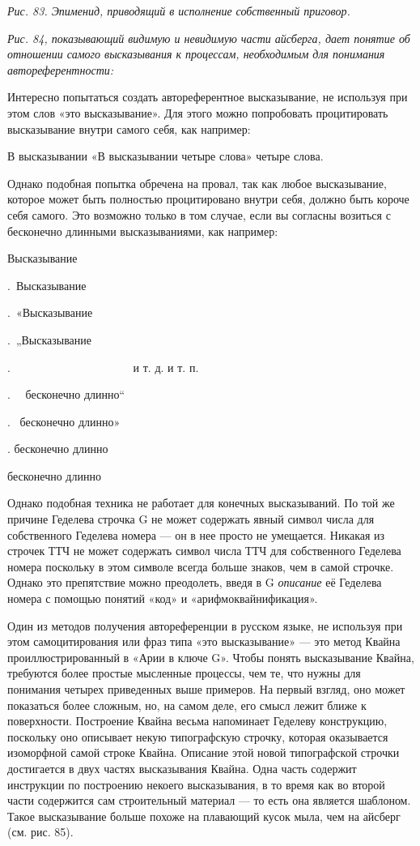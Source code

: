 \documentclass[../main.tex]{subfiles}
\begin{document}
\emph{Рис. 83. Эпименид, приводящий в исполнение собственный приговор.}

\emph{Рис. 84, показывающий видимую и невидимую части айсберга, дает понятие об отношении самого высказывания к процессам, необходимым для понимания автореферентности:}

Интересно попытаться создать автореферентное высказывание, не используя при этом слов «это высказывание». Для этого можно попробовать процитировать высказывание внутри самого себя, как например:

В высказывании «В высказывании четыре слова» четыре слова.

Однако подобная попытка обречена на провал, так как любое высказывание, которое может быть полностью процитировано внутри себя, должно быть короче себя самого. Это возможно только в том случае, если вы согласны возиться с бесконечно длинными высказываниями, как например:

Высказывание

.~Высказывание

.~«Высказывание

.~„Высказывание

.~~~~~~~~~~~~~~~~~~~~~ и т. д. и т. п.

.~~ бесконечно длинно``

.~ бесконечно длинно»

. бесконечно длинно

бесконечно длинно

Однако подобная техника не работает для конечных высказываний. По той же причине Геделева строчка G не может содержать явный символ числа для собственного Геделева номера --- он в нее просто не умещается. Никакая из строчек ТТЧ не может содержать символ числа ТТЧ для собственного Геделева номера поскольку в этом символе всегда больше знаков, чем в самой строчке. Однако это препятствие можно преодолеть, введя в G \emph{описание} её Геделева номера с помощью понятий «код» и «арифмоквайнификация».

Один из методов получения автореференции в русском языке, не используя при этом самоцитирования или фраз типа «это высказывание» --- это метод Квайна проиллюстрированный в «Арии в ключе G». Чтобы понять высказывание Квайна, требуются более простые мысленные процессы, чем те, что нужны для понимания четырех приведенных выше примеров. На первый взгляд, оно может показаться более сложным, но, на самом деле, его смысл лежит ближе к поверхности. Построение Квайна весьма напоминает Геделеву конструкцию, поскольку оно описывает некую типографскую строчку, которая оказывается изоморфной самой строке Квайна. Описание этой новой типографской строчки достигается в двух частях высказывания Квайна. Одна часть содержит инструкции по построению некоего высказывания, в то время как во второй части содержится сам строительный материал --- то есть она является шаблоном. Такое высказывание больше похоже на плавающий кусок мыла, чем на айсберг (см. рис. 85).
\end{document}
